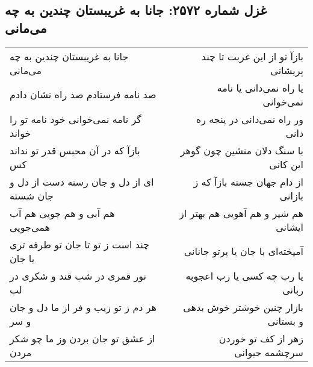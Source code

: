 \begin{center}
\section*{غزل شماره ۲۵۷۲: جانا به غریبستان چندین به چه می‌مانی}
\label{sec:2572}
\begin{longtable}{l p{0.5cm} r}
جانا به غریبستان چندین به چه می‌مانی
&&
بازآ تو از این غربت تا چند پریشانی
\\
صد نامه فرستادم صد راه نشان دادم
&&
یا راه نمی‌دانی یا نامه نمی‌خوانی
\\
گر نامه نمی‌خوانی خود نامه تو را خواند
&&
ور راه نمی‌دانی در پنجه ره دانی
\\
بازآ که در آن محبس قدر تو نداند کس
&&
با سنگ دلان منشین چون گوهر این کانی
\\
ای از دل و جان رسته دست از دل و جان شسته
&&
از دام جهان جسته بازآ که ز بازانی
\\
هم آبی و هم جویی هم آب همی‌جویی
&&
هم شیر و هم آهویی هم بهتر از ایشانی
\\
چند است ز تو تا جان تو طرفه تری یا جان
&&
آمیخته‌ای با جان یا پرتو جانانی
\\
نور قمری در شب قند و شکری در لب
&&
یا رب چه کسی یا رب اعجوبه ربانی
\\
هر دم ز تو زیب و فر از ما دل و جان و سر
&&
بازار چنین خوشتر خوش بدهی و بستانی
\\
از عشق تو جان بردن وز ما چو شکر مردن
&&
زهر از کف تو خوردن سرچشمه حیوانی
\\
\end{longtable}
\end{center}
